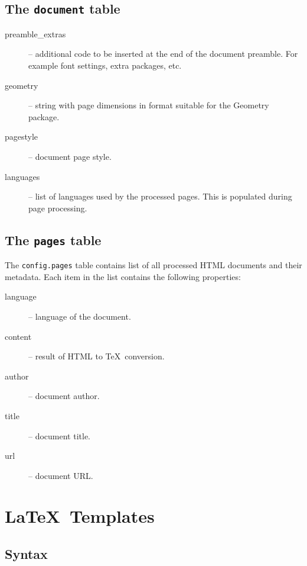 \documentclass{article}
\begin{document}
\subsection{The \texttt{document} table}

\begin{description}

  \item[preamble\_extras] -- additional code to be inserted at the end of the
    document preamble. For example font settings, extra packages, etc.
  \item[geometry] -- string with page dimensions in format suitable for the Geometry package. 
  \item[pagestyle] -- document page style.
  \item[languages] -- list of languages used by the processed pages. This is populated during page processing.


\end{description}

\subsection{The \texttt{pages} table}

The \texttt{config.pages} table contains list of all processed HTML documents and their metadata.
Each item in the list contains the following properties:

\begin{description}
  \item[language] -- language of the document.
  \item[content] -- result of HTML to \TeX\ conversion.
  \item[author] -- document author.
  \item[title] -- document title.
  \item[url] -- document URL.
\end{description}


\section{\LaTeX\ Templates}


\subsection{Syntax}
\end{document}
